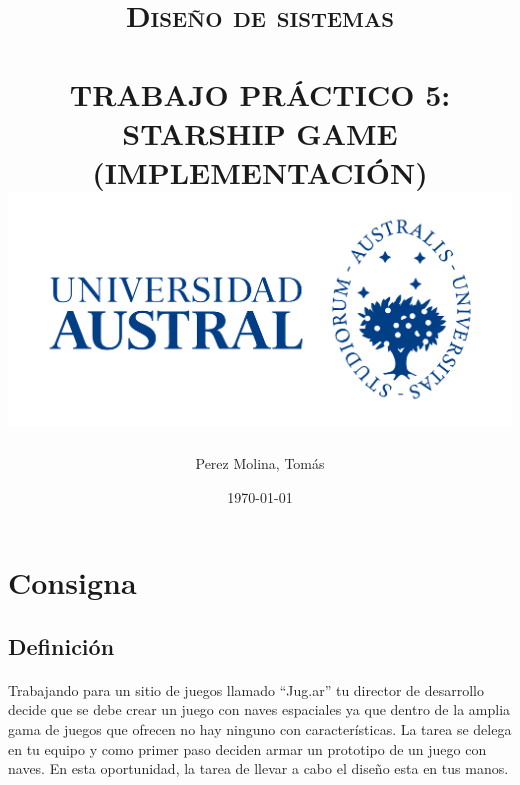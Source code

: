 \documentclass[a4paper,10pt]{extarticle}
\title{	\large \textsc{Diseño de sistemas} 	%
		 	\\[2.0cm]								%
			\HRule{0.5pt} \\						%
			\LARGE \textbf{\uppercase{Trabajo Práctico 5:\\ Starship Game (Implementación)}}	%
			\HRule{0.5pt} \\ [0.5cm]		%
      \vfill
      \includegraphics[scale=0.75]{austral_logo.jpg}
}
\author{
        Perez Molina, Tomás\\[0.5cm]
}
\date{
    \today\\
}
\makeatletter
\def\printtitle{%
    {\centering \@title\par}}
\def\printauthor{%
    {\centering \large \@author}}
\def\printdate{%
    {\centering \small \@date}}
\makeatother
\begin{document}
\thispagestyle{empty}		%

\printtitle					%
\vfill



\printauthor				%
\printdate
\newpage



\tableofcontents
\thispagestyle{empty}
\pagebreak

\setcounter{page}{1} %

\pagebreak
\section{Consigna}
    \subsection{Definición}
        \paragraph{}
        Trabajando para un sitio de juegos llamado “Jug.ar” tu director de desarrollo
        decide que se debe crear un juego con naves espaciales ya que dentro de la
        amplia gama de juegos que ofrecen no hay ninguno con características. La tarea
        se delega en tu equipo y como primer paso deciden armar un prototipo de un
        juego con naves. En esta oportunidad, la tarea de llevar a cabo el diseño esta en
        tus manos.
\end{document}
